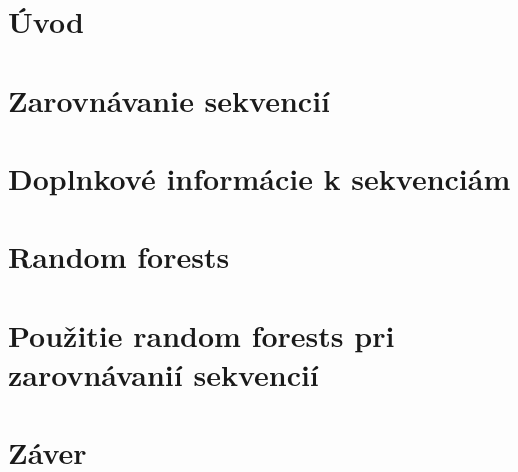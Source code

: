 {}
\chapter*{Úvod}
\chapter{Zarovnávanie sekvencií}
\chapter{Doplnkové informácie k sekvenciám}
\chapter{Random forests}
\chapter{Použitie random forests pri zarovnávanií sekvencií}
{}
\chapter*{Záver}
%